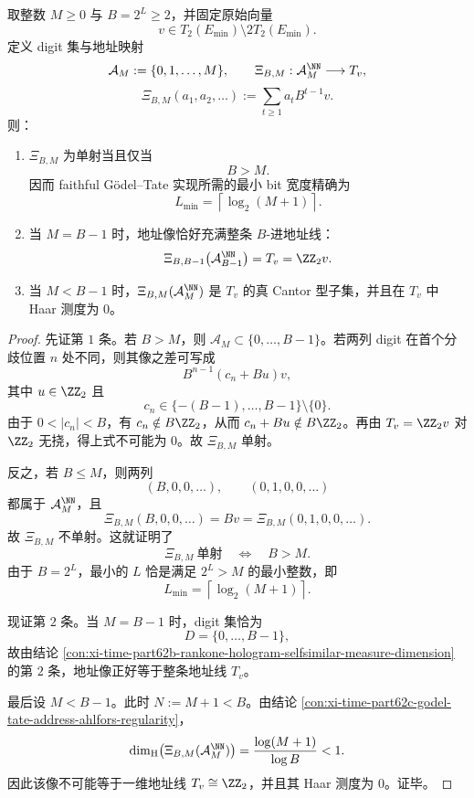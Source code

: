 \begin{conclusion}\label{con:xi-time-part62c-godel-tate-minimal-bitwidth-threshold}
取整数 \(M\ge 0\) 与 \(B=2^L\ge 2\)，并固定原始向量
\[
v\in T_2(E_{\min})\setminus 2T_2(E_{\min}).
\]
定义 digit 集与地址映射
\[
\mathcal A_M:=\{0,1,\dots,M\},
\qquad
\Xi_{B,M}:\mathcal A_M^{\NN}\longrightarrow T_v,
\]
\[
\Xi_{B,M}(a_1,a_2,\dots):=\sum_{t\ge 1}a_tB^{t-1}v.
\]
则：
\begin{enumerate}
  \item \(\Xi_{B,M}\) 为单射当且仅当
  \[
  B>M.
  \]
  因而 faithful Gödel--Tate 实现所需的最小 bit 宽度精确为
  \[
  L_{\min}=\left\lceil \log_2(M+1)\right\rceil.
  \]
  \item 当 \(M=B-1\) 时，地址像恰好充满整条 \(B\)-进地址线：
  \[
  \Xi_{B,B-1}\bigl(\mathcal A_{B-1}^{\NN}\bigr)=T_v=\ZZ_2v.
  \]
  \item 当 \(M<B-1\) 时，\(\Xi_{B,M}(\mathcal A_M^{\NN})\) 是 \(T_v\) 的真 Cantor 型子集，并且在 \(T_v\) 中 Haar 测度为 \(0\)。
\end{enumerate}
\end{conclusion}
\begin{proof}
先证第 \(1\) 条。若 \(B>M\)，则 \(\mathcal A_M\subset\{0,\dots,B-1\}\)。若两列 digit 在首个分歧位置 \(n\) 处不同，则其像之差可写成
\[
B^{n-1}(c_n+Bu)v,
\]
其中 \(u\in\ZZ_2\) 且
\[
c_n\in\{-(B-1),\dots,B-1\}\setminus\{0\}.
\]
由于 \(0<|c_n|<B\)，有 \(c_n\notin B\ZZ_2\)，从而 \(c_n+Bu\notin B\ZZ_2\)。再由 \(T_v=\ZZ_2v\) 对 \(\ZZ_2\) 无挠，得上式不可能为 \(0\)。故 \(\Xi_{B,M}\) 单射。

反之，若 \(B\le M\)，则两列
\[
(B,0,0,\dots),
\qquad
(0,1,0,0,\dots)
\]
都属于 \(\mathcal A_M^{\NN}\)，且
\[
\Xi_{B,M}(B,0,0,\dots)=Bv=\Xi_{B,M}(0,1,0,0,\dots).
\]
故 \(\Xi_{B,M}\) 不单射。这就证明了
\[
\Xi_{B,M}\ \text{单射}
\quad\Longleftrightarrow\quad
B>M.
\]
由于 \(B=2^L\)，最小的 \(L\) 恰是满足 \(2^L>M\) 的最小整数，即
\[
L_{\min}=\left\lceil\log_2(M+1)\right\rceil.
\]

现证第 \(2\) 条。当 \(M=B-1\) 时，digit 集恰为
\[
D=\{0,\dots,B-1\},
\]
故由结论 \ref{con:xi-time-part62b-rankone-hologram-selfsimilar-measure-dimension} 的第 \(2\) 条，地址像正好等于整条地址线 \(T_v\)。

最后设 \(M<B-1\)。此时 \(N:=M+1<B\)。由结论 \ref{con:xi-time-part62c-godel-tate-address-ahlfors-regularity}，
\[
\dim_{\mathrm H}\bigl(\Xi_{B,M}(\mathcal A_M^{\NN})\bigr)
=
\frac{\log(M+1)}{\log B}<1.
\]
因此该像不可能等于一维地址线 \(T_v\cong\ZZ_2\)，并且其 Haar 测度为 \(0\)。证毕。
\end{proof}

